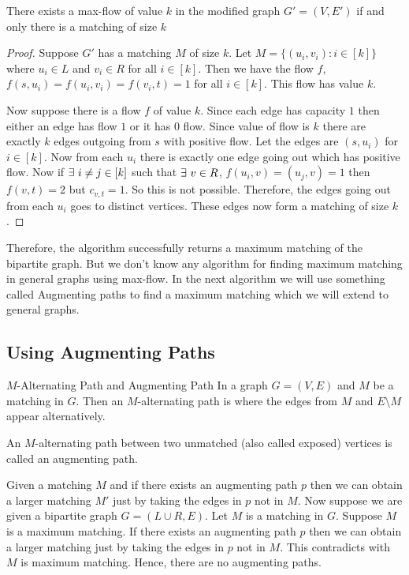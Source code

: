 \begin{lemma}{}{}
	There exists a max-flow of value $k$ in the modified graph $G'=(V,E')$ if and only there is a matching of size $k$
\end{lemma}
\begin{proof}
	Suppose $G'$ has a matching $M$ of size $k$. Let $M=\{(u_i,v_i)\colon i\in[k]\}$ where $u_i\in L$ and $v_i\in R$ for all $i\in[k]$. Then we have the flow $f$, $f(s,u_i)=f(u_i,v_i)=f(v_i,t)=1$ for all $i\in[k]$. This flow has value $k$.

	Now suppose there is a flow $f$ of value $k$. Since each edge has capacity $1$ then either an edge has flow $1$ or it has $0$ flow. Since value of flow is $k$ there are exactly $k$ edges outgoing from $s$ with positive flow. Let the edges are $(s,u_i)$ for $i\in[k]$. Now from each $u_i$ there is exactly one edge going out which has positive flow. Now if $\exists\ i\neq j\in[k]$ such that $\exists\ v\in R$, $f(u_i,v)=(u_j,v)=1$ then $f(v,t)=2$ but $c_{v,t}=1$. So this is not possible. Therefore, the edges going out from each $u_i$ goes to distinct vertices. These edges now form a matching of size $k$.
\end{proof}

Therefore, the algorithm successfully returns a maximum matching of the bipartite graph. But we don't know any algorithm for finding maximum matching in general graphs using max-flow. In the next algorithm we will use something called Augmenting paths to find a maximum matching which we will extend to general graphs.
\subsection{Using Augmenting Paths}\label{section:bp-augment-path}
\begin{Definition}{$M$-Alternating Path and Augmenting Path}{}
	In a graph $G=(V,E)$ and $M$ be a matching in $G$. Then an $M$-alternating path is where the edges from $M$ and $E\setminus M$ appear alternatively.\parinn

	An $M$-alternating path between two unmatched (also called exposed) vertices is called an augmenting path.
\end{Definition}

Given a matching $M$ and if there exists an augmenting path $p$ then we can obtain a larger matching $M'$ just by taking the edges in $p$ not in $M$. Now suppose we are given a bipartite graph $G=(L\cup R, E)$. Let $M$ is a matching in $G$. Suppose $M$ is a maximum matching. If there exists an augmenting path $p$ then we can obtain a larger matching just by taking the edges in $p$ not in $M$. This contradicts with $M$ is maximum matching. Hence, there are no augmenting paths.

